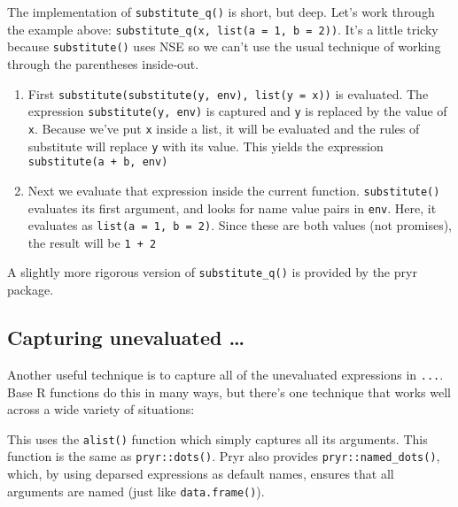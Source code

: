 The implementation of \texttt{substitute\_q()} is short, but deep. Let's
work through the example above:
\texttt{substitute\_q(x, list(a = 1, b = 2))}. It's a little tricky
because \texttt{substitute()} uses NSE so we can't use the usual
technique of working through the parentheses inside-out.

\begin{enumerate}
\def\labelenumi{\arabic{enumi}.}
\item
  First \texttt{substitute(substitute(y, env), list(y = x))} is
  evaluated. The expression \texttt{substitute(y, env)} is captured and
  \texttt{y} is replaced by the value of \texttt{x}. Because we've put
  \texttt{x} inside a list, it will be evaluated and the rules of
  substitute will replace \texttt{y} with its value. This yields the
  expression \texttt{substitute(a + b, env)}
\item
  Next we evaluate that expression inside the current function.
  \texttt{substitute()} evaluates its first argument, and looks for name
  value pairs in \texttt{env}. Here, it evaluates as
  \texttt{list(a = 1, b = 2)}. Since these are both values (not
  promises), the result will be \texttt{1 + 2}
\end{enumerate}

A slightly more rigorous version of \texttt{substitute\_q()} is provided
by the pryr package.

\subsection{Capturing unevaluated \ldots{}}\label{capturing-dots}

Another useful technique is to capture all of the unevaluated
expressions in \texttt{...}. Base R functions do this in many ways, but
there's one technique that works well across a wide variety of
situations: 

\begin{Shaded}
\begin{Highlighting}[]
\StringTok{ }
  \NormalTok{(}\NormalTok{(}
\NormalTok{\}}
\end{Highlighting}
\end{Shaded}

This uses the \texttt{alist()} function which simply captures all its
arguments. This function is the same as \texttt{pryr::dots()}. Pryr also
provides \texttt{pryr::named\_dots()}, which, by using deparsed
expressions as default names, ensures that all arguments are named (just
like \texttt{data.frame()}). 


